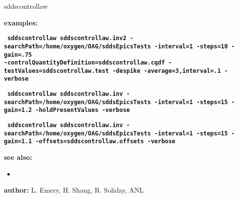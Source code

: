\begin{sddsprog}{sddscontrollaw}
\item \textbf{examples:}
     \begin{flushleft}{\tt \bf
        sddscontrollaw sddscontrollaw.inv2 -searchPath=/home/oxygen/OAG/sddsEpicsTests -interval=1 -steps=10 -gain=.75 \\
         -controlQuantityDefinition=sddscontrollaw.cqdf -testValues=sddscontrollaw.test -despike -average=3,interval=.1 -verbose
     }\end{flushleft}

      \begin{flushleft}{\tt \bf
     sddscontrollaw sddscontrollaw.inv -searchPath=/home/oxygen/OAG/sddsEpicsTests  -interval=1 -steps=15 -gain=1.2 -holdPresentValues -verbose
      }\end{flushleft}

     \begin{flushleft}{\tt \bf
     sddscontrollaw sddscontrollaw.inv -searchPath=/home/oxygen/OAG/sddsEpicsTests  -interval=1 -steps=15 -gain=1.1 -offsets=sddscontrollaw.offsets -verbose
     }\end{flushleft}
        
\item \textbf{see also:}
 
%    
    \begin{itemize}
    \item {}
    \end{itemize}
\item \textbf{author:} L. Emery, H. Shang, R. Soliday, ANL
\end{sddsprog}
